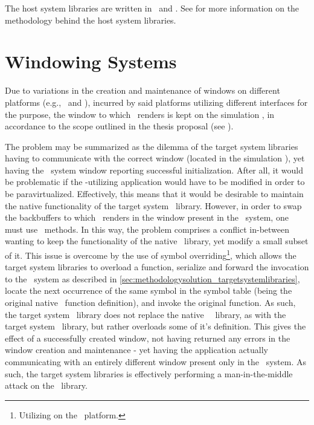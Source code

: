 The host system libraries are written in \dvttermc\ and \dvttermcplusplus .
See  for more information on the methodology behind the host system libraries.

\section{Windowing Systems}
\label{sec:methodologysolution_windowingsystems}
Due to variations in the creation and maintenance of windows on different platforms (e.g., \dvttermfedora\ and \dvttermandroid ), incurred by said platforms utilizing different interfaces for the purpose, the window to which \dvttermopengl\ renders is kept on the simulation \dvttermhost , in accordance to the scope outlined in the thesis proposal (see ).

The problem may be summarized as the dilemma of the target system libraries having to communicate with the correct window (located in the simulation \dvttermhost ), yet having the \dvttermtarget\ system window reporting successful initialization.
After all, it would be problematic if the \dvttermopengl -utilizing application would have to be modified in order to be paravirtualized.
Effectively, this means that it would be desirable to maintain the native functionality of the target system \dvttermegl\ library.
However, in order to swap the backbuffers to which \dvttermopengl\ renders in the window present in the \dvttermhost\ system, one must use \dvttermegl\ methods.
In this way, the problem comprises a conflict in-between wanting to keep the functionality of the native \dvttermegl\ library, yet modify a small subset of it. 
This issue is overcome by the use of symbol overriding\footnote{Utilizing  on the \dvttermlinux\ platform.}, which allows the target system libraries to overload a function, serialize and forward the invocation to the \dvttermhost\ system as described in \ref{sec:methodologysolution_targetsystemlibraries}, locate the next occurrence of the same symbol in the symbol table (being the original native \dvttermegl\ function definition), and invoke the original function.
As such, the target system \dvttermegl\ library does not replace the native \dvttermtarget\ \dvttermegl\ library, as with the target system \dvttermopengl\ library, but rather overloads some of it's definition.
This gives the effect of a successfully created window, not having returned any errors in the window creation and maintenance - yet having the application actually communicating with an entirely different window present only in the \dvttermhost\ system.
As such, the target system libraries is effectively performing a man-in-the-middle attack on the \dvttermegl\ library.

